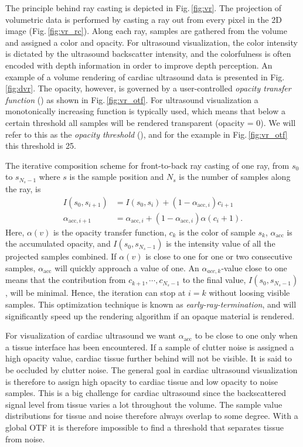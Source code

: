 The principle behind ray casting is depicted in Fig.\,\ref{fig:vr}. The projection of volumetric data is performed by casting a ray out from every pixel in the 2D image (Fig.\,\ref{fig:vr_rc}). Along each ray, samples are gathered from the volume and assigned a color and opacity. For ultrasound visualization, the color intensity is dictated by the ultrasound backscatter intensity, and the colorfulness is often encoded with depth information in order to improve depth perception. An example of a volume rendering of cardiac ultrasound data is presented in Fig.\,\ref{fig:dvr}. The opacity, however, is governed by a user-controlled \textit{opacity transfer function} () as shown in Fig.\,\ref{fig:vr_otf}. For ultrasound visualization a monotonically increasing function is typically used, which means that below a certain threshold all samples will be rendered transparent (opacity = 0). We will refer to this as the \textit{opacity threshold} (), and for the example in Fig.\,\ref{fig:vr_otf} this threshold is 25.

The iterative composition scheme for front-to-back ray casting of one ray, from $s_0$ to $s_{N_s-1}$ where $s$ is the sample position and $N_s$ is the number of samples along the ray, is \cite{rtvg2006}
\begin{align}
I(s_0, s_{i+1}) &= I(s_0, s_{i}) + (1 - \alpha_{\text{acc},i}) c_{i+1}\\
\alpha_{\text{acc},i+1} &= \alpha_{\text{acc},i} + (1 - \alpha_{\text{acc},i}) \alpha(c_i+1).
\label{eq:fronToBack}
\end{align}
Here, $\alpha(v)$ is the opacity transfer function, $c_{k}$ is the color of sample $s_{k}$, $\alpha_{\text{acc}}$ is the accumulated opacity, and $I(s_0, s_{N_s-1})$ is the intensity value of all the projected samples combined. If $\alpha(v)$ is close to one for one or two consecutive samples, $\alpha_{\text{acc}}$ will quickly approach a value of one. An $\alpha_{acc,k}$-value close to one means that the contribution from $c_{k+1}, \cdots, c_{N_s-1}$ to the final value, $I(s_0, s_{N_s-1})$, will be minimal. Hence, the iteration can stop at $i=k$ without loosing visible samples. This optimization technique is known as \textit{early-ray-termination}, and will significantly speed up the rendering algorithm if an opaque material is rendered.

For visualization of cardiac ultrasound we want $\alpha_{\text{acc}}$ to be close to one only when a tissue interface has been encountered. If a sample of clutter noise is assigned a high opacity value, cardiac tissue further behind will not be visible. It is said to be occluded by clutter noise. The general goal in cardiac ultrasound visualization is therefore to assign high opacity to cardiac tissue and low opacity to noise samples. This is a big challenge for cardiac ultrasound since the backscattered signal level from tissue varies a lot throughout the volume. The sample value distributions for tissue and noise therefore always overlap to some degree. With a global OTF it is therefore impossible to find a threshold that separates tissue from noise.

